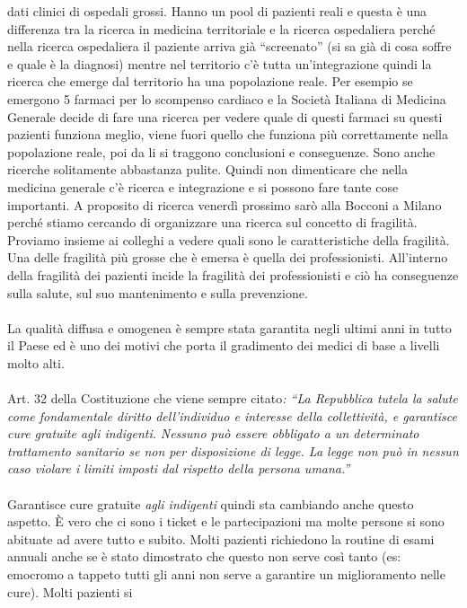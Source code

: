 dati clinici di ospedali grossi. Hanno un pool di pazienti reali e
questa è una differenza tra la ricerca in medicina territoriale e la
ricerca ospedaliera perché nella ricerca ospedaliera il paziente arriva
già ``screenato'' (si sa già di cosa soffre e quale è la diagnosi)
mentre nel territorio c'è tutta un'integrazione quindi la ricerca che
emerge dal territorio ha una popolazione reale. Per esempio se emergono
5 farmaci per lo scompenso cardiaco e la Società Italiana di Medicina
Generale decide di fare una ricerca per vedere quale di questi farmaci
su questi pazienti funziona meglio, viene fuori quello che funziona più
correttamente nella popolazione reale, poi da li si traggono conclusioni
e conseguenze. Sono anche ricerche solitamente abbastanza pulite. Quindi
non dimenticare che nella medicina generale c'è ricerca e integrazione e
si possono fare tante cose importanti. A proposito di ricerca venerdì
prossimo sarò alla Bocconi a Milano perché stiamo cercando di
organizzare una ricerca sul concetto di fragilità. Proviamo insieme ai
colleghi a vedere quali sono le caratteristiche della fragilità. Una
delle fragilità più grosse che è emersa è quella dei professionisti.
All'interno della fragilità dei pazienti incide la fragilità dei
professionisti e ciò ha conseguenze sulla salute, sul suo mantenimento e
sulla prevenzione.
\\\\
La qualità diffusa e omogenea è sempre stata garantita negli ultimi anni
in tutto il Paese ed è uno dei motivi che porta il gradimento dei medici
di base a livelli molto alti.
\\\\
Art. 32 della Costituzione che viene sempre citato\emph{: ``La
Repubblica tutela la salute come fondamentale diritto dell'individuo e
interesse della collettività, e garantisce cure gratuite agli
indigenti.} \emph{Nessuno può essere
obbligato a un determinato trattamento sanitario se non per disposizione
di legge. La legge non può in nessun caso violare i limiti imposti dal
rispetto della persona umana.''}
\\\\
Garantisce cure gratuite \emph{agli indigenti} quindi sta cambiando
anche questo aspetto. È vero che ci sono i ticket e le partecipazioni ma
molte persone si sono abituate ad avere tutto e subito. Molti pazienti
richiedono la routine di esami annuali anche se è stato dimostrato che
questo non serve così tanto (es: emocromo a tappeto tutti gli anni non
serve a garantire un miglioramento nelle cure). Molti pazienti si
